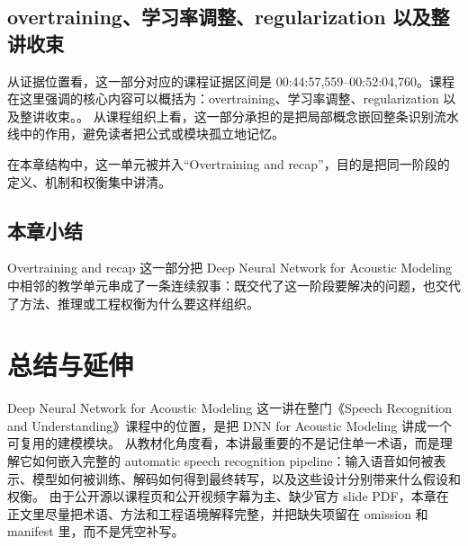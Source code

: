 \documentclass[a4paper]{article}
\begin{document}
\subsection{overtraining、学习率调整、regularization 以及整讲收束}
从证据位置看，这一部分对应的课程证据区间是 00:44:57,559--00:52:04,760。课程在这里强调的核心内容可以概括为：overtraining、学习率调整、regularization 以及整讲收束。。
从课程组织上看，这一部分承担的是把局部概念嵌回整条识别流水线中的作用，避免读者把公式或模块孤立地记忆。

在本章结构中，这一单元被并入“Overtraining and recap”，目的是把同一阶段的定义、机制和权衡集中讲清。

\subsection{本章小结}
Overtraining and recap 这一部分把 Deep Neural Network for Acoustic Modeling 中相邻的教学单元串成了一条连续叙事：既交代了这一阶段要解决的问题，也交代了方法、推理或工程权衡为什么要这样组织。

\section{总结与延伸}
Deep Neural Network for Acoustic Modeling 这一讲在整门《Speech Recognition and Understanding》课程中的位置，是把 DNN for Acoustic Modeling 讲成一个可复用的建模模块。
从教材化角度看，本讲最重要的不是记住单一术语，而是理解它如何嵌入完整的 automatic speech recognition pipeline：输入语音如何被表示、模型如何被训练、解码如何得到最终转写，以及这些设计分别带来什么假设和权衡。
由于公开源以课程页和公开视频字幕为主、缺少官方 slide PDF，本章在正文里尽量把术语、方法和工程语境解释完整，并把缺失项留在 omission 和 manifest 里，而不是凭空补写。
\end{document}
